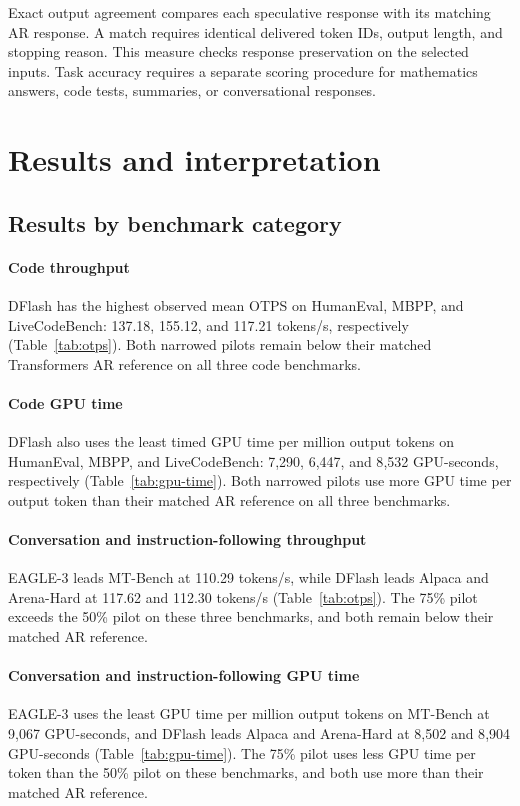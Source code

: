 \documentclass[conference,onecolumn]{IEEEtran}
\begin{document}
Exact output agreement compares each speculative response with its matching AR response. A match requires identical delivered token IDs, output length, and stopping reason. This measure checks response preservation on the selected inputs. Task accuracy requires a separate scoring procedure for mathematics answers, code tests, summaries, or conversational responses.

\section{Results and interpretation}



\subsection{Results by benchmark category}
\paragraph*{Code throughput}
DFlash has the highest observed mean OTPS on HumanEval, MBPP, and LiveCodeBench: 137.18, 155.12, and 117.21 tokens/s, respectively (Table~\ref{tab:otps}). Both narrowed pilots remain below their matched Transformers AR reference on all three code benchmarks.

\paragraph*{Code GPU time}
DFlash also uses the least timed GPU time per million output tokens on HumanEval, MBPP, and LiveCodeBench: 7{,}290, 6{,}447, and 8{,}532 GPU-seconds, respectively (Table~\ref{tab:gpu-time}). Both narrowed pilots use more GPU time per output token than their matched AR reference on all three benchmarks.

\paragraph*{Conversation and instruction-following throughput}
EAGLE-3 leads MT-Bench at 110.29 tokens/s, while DFlash leads Alpaca and Arena-Hard at 117.62 and 112.30 tokens/s (Table~\ref{tab:otps}). The 75\% pilot exceeds the 50\% pilot on these three benchmarks, and both remain below their matched AR reference.

\paragraph*{Conversation and instruction-following GPU time}
EAGLE-3 uses the least GPU time per million output tokens on MT-Bench at 9{,}067 GPU-seconds, and DFlash leads Alpaca and Arena-Hard at 8{,}502 and 8{,}904 GPU-seconds (Table~\ref{tab:gpu-time}). The 75\% pilot uses less GPU time per token than the 50\% pilot on these benchmarks, and both use more than their matched AR reference.
\end{document}
